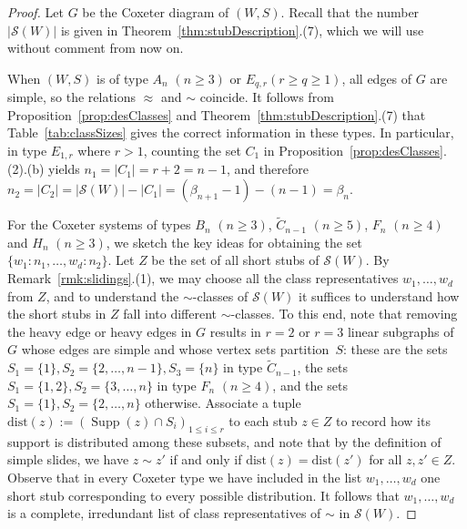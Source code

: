 \documentclass[ALCO,Unicode,published]{cedram}
\newcommand{\sw}{\mathcal{S}(W)}
\newcommand{\abs}[1]{\lvert #1 \rvert}
\DeclareMathOperator{\supp}{\mathrm{Supp}}
\begin{document}
\begin{proof}
Let $G$ be the Coxeter diagram of $(W,S)$. Recall that the number $\abs{\sw}$ is given in
Theorem~\ref{thm:stubDescription}.(7), which we will use without comment from now on. 

When $(W,S)$ is of type $A_n$ $(n\ge 3)$ or $E_{q,r} (r\ge q\ge 1)$, all edges of $G$ are simple, so
the relations $\approx$ and $\sim$ coincide. It follows from Proposition~\ref{prop:desClasses} and
Theorem~\ref{thm:stubDescription}.(7) that Table~\ref{tab:classSizes} gives the correct information in these
types. In particular, in type $E_{1,r}$ where $r>1$, counting the set $C_1$ in
Proposition~\ref{prop:desClasses}.(2).(b) yields $n_1=\abs{C_1}=r+2=n-1$, and therefore
$n_2=\abs{C_2}=\abs{\sw}-\abs{C_1}=(\beta_{n+1}-1)-(n-1)=\beta_n$.

For the Coxeter systems of types $B_n$ $(n\ge 3)$, $\tilde C_{n-1}$ $(n\ge 5)$, $F_n$ $(n\ge 4)$ and $H_n$
$(n\ge 3)$, we sketch the key ideas for obtaining the set $\{w_1:n_1, \dots, w_d:n_2\}$. Let $Z$ be
the set of all short stubs of $\sw$. By Remark~\ref{rmk:slidings}.(1), we may choose all the class
representatives $w_1,\dots, w_d$ from $Z$, and to understand the $\sim$-classes of $\sw$ it suffices
to understand how the short stubs in $Z$ fall into different $\sim$-classes. To this end, note that
removing the heavy edge or heavy edges in $G$ results in $r=2$ or $r=3$ linear subgraphs of $G$
whose edges are simple and whose vertex sets partition~$S$: these are the sets $S_1=\{1\},
S_2=\{2,\dots, n-1\}, S_3=\{n\}$ in type $\tilde C_{n-1}$, the sets $S_1=\{1,2\}, S_2=\{3,\dots,n\}$
in type $F_n$ $(n\ge 4)$, and the sets $S_1=\{1\}, S_2=\{2,\dots,n\}$ otherwise.  Associate a tuple
$\mathrm{dist}(z):=(\supp(z)\cap S_i)_{1\le i\le r}$ to each stub $z\in Z$ to record how its support
is distributed among these subsets, and note that by the definition of simple slides, we have $z\sim
z'$ if and only if $\mathrm{dist}(z)=\mathrm{dist}(z')$ for all $z,z'\in Z$.  Observe that in every
Coxeter type we have included in the list $w_1,\dots, w_d$ one short stub corresponding to every
possible distribution.  It follows that $w_1,\dots,w_d$ is a complete, irredundant list of class
representatives of $\sim$ in $\sw$.  


\end{proof}
\end{document}
